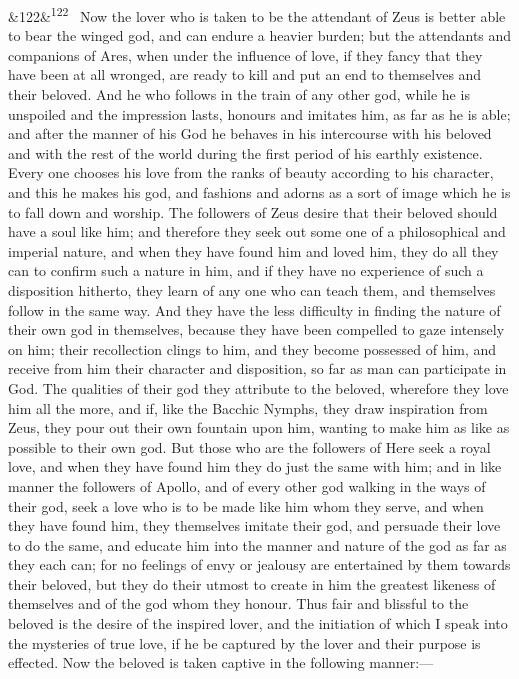 \documentclass[12pt]{article}
\newcommand{\para}[1][]{\par\noindent\ifx&#1&\else\textsuperscript{\footnotesize #1}~\fi}
\begin{document}
\para[122] Now the lover who is taken to be the attendant of Zeus is better able to bear the winged god, and can endure a heavier burden; but the attendants and companions of Ares, when under the influence of love, if they fancy that they have been at all wronged, are ready to kill and put an end to themselves and their beloved. And he who follows in the train of any other god, while he is unspoiled and the impression lasts, honours and imitates him, as far as he is able; and after the manner of his God he behaves in his intercourse with his beloved and with the rest of the world during the first period of his earthly existence. Every one chooses his love from the ranks of beauty according to his character, and this he makes his god, and fashions and adorns as a sort of image which he is to fall down and worship. The followers of Zeus desire that their beloved should have a soul like him; and therefore they seek out some one of a philosophical and imperial nature, and when they have found him and loved him, they do all they can to confirm such a nature in him, and if they have no experience of such a disposition hitherto, they learn of any one who can teach them, and themselves follow in the same way. And they have the less difficulty in finding the nature of their own god in themselves, because they have been compelled to gaze intensely on him; their recollection clings to him, and they become possessed of him, and receive from him their character and disposition, so far as man can participate in God. The qualities of their god they attribute to the beloved, wherefore they love him all the more, and if, like the Bacchic Nymphs, they draw inspiration from Zeus, they pour out their own fountain upon him, wanting to make him as like as possible to their own god. But those who are the followers of Here seek a royal love, and when they have found him they do just the same with him; and in like manner the followers of Apollo, and of every other god walking in the ways of their god, seek a love who is to be made like him whom they serve, and when they have found him, they themselves imitate their god, and persuade their love to do the same, and educate him into the manner and nature of the god as far as they each can; for no feelings of envy or jealousy are entertained by them towards their beloved, but they do their utmost to create in him the greatest likeness of themselves and of the god whom they honour. Thus fair and blissful to the beloved is the desire of the inspired lover, and the initiation of which I speak into the mysteries of true love, if he be captured by the lover and their purpose is effected. Now the beloved is taken captive in the following manner:---
\end{document}
